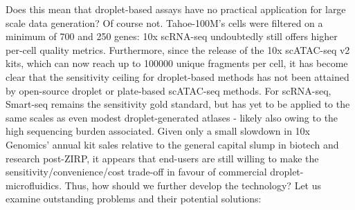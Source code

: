 Does this mean that droplet-based assays have no practical application for large scale data generation? Of course not. Tahoe-100M's cells were filtered on a minimum of 700 and 250 genes: 10x scRNA-seq undoubtedly still offers higher per-cell quality metrics. Furthermore, since the release of the 10x scATAC-seq v2 kits, which can now reach up to \mbox{\num{100000}} unique fragments per cell, it has become clear that the sensitivity ceiling for droplet-based methods has not been attained by open-source droplet or plate-based scATAC-seq methods. For scRNA-seq, Smart-seq remains the sensitivity gold standard, but has yet to be applied to the same scales as even modest droplet-generated atlases - likely also owing to the high sequencing burden associated. Given only a small slowdown in 10x Genomics' annual kit sales relative to the general capital slump in biotech and research post-ZIRP, it appears that end-users are still willing to make the sensitivity/convenience/cost trade-off in favour of commercial droplet-microfluidics. Thus, how should we further develop the technology? Let us examine outstanding problems and their potential solutions:

